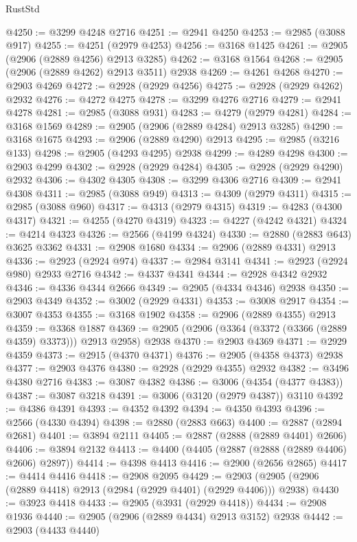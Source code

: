 \begin{lexlean}{RustStd}
\begin{coremodule}
{\begin{coremodule}
{{{{{{{{{{{{{{{{{{{{{{{{{{{{{{{{{{{{{{{{{{{{{{{{{{{{{{{{{{{{{{{{{{{{{{{{{{{{{{@4250 := @3299 @4248 @2716
@4251 := @2941 @4250
@4253 := @2985 (@3088 @917)
@4255 := @4251 (@2979 @4253)
@4256 := @3168 @1425
@4261 := @2905 (@2906 (@2889 @4256) @2913 @3285)
@4262 := @3168 @1564
@4268 := @2905 (@2906 (@2889 @4262) @2913 @3511) @2938
@4269 := @4261 @4268
@4270 := @2903 @4269
@4272 := @2928 (@2929 @4256)
@4275 := @2928 (@2929 @4262) @2932
@4276 := @4272 @4275
@4278 := @3299 @4276 @2716
@4279 := @2941 @4278
@4281 := @2985 (@3088 @931)
@4283 := @4279 (@2979 @4281)
@4284 := @3168 @1569
@4289 := @2905 (@2906 (@2889 @4284) @2913 @3285)
@4290 := @3168 @1675
@4293 := @2906 (@2889 @4290) @2913
@4295 := @2985 (@3216 @133)
@4298 := @2905 (@4293 @4295) @2938
@4299 := @4289 @4298
@4300 := @2903 @4299
@4302 := @2928 (@2929 @4284)
@4305 := @2928 (@2929 @4290) @2932
@4306 := @4302 @4305
@4308 := @3299 @4306 @2716
@4309 := @2941 @4308
@4311 := @2985 (@3088 @949)
@4313 := @4309 (@2979 @4311)
@4315 := @2985 (@3088 @960)
@4317 := @4313 (@2979 @4315)
@4319 := @4283 (@4300 @4317)
@4321 := @4255 (@4270 @4319)
@4323 := @4227 (@4242 @4321)
@4324 := @4214 @4323
@4326 := @2566 (@4199 @4324)
@4330 := @2880 (@2883 @643) @3625 @3362
@4331 := @2908 @1680
@4334 := @2906 (@2889 @4331) @2913
@4336 := @2923 (@2924 @974)
@4337 := @2984 @3141
@4341 := @2923 (@2924 @980) @2933 @2716
@4342 := @4337 @4341
@4344 := @2928 @4342 @2932
@4346 := @4336 @4344 @2666
@4349 := @2905 (@4334 @4346) @2938
@4350 := @2903 @4349
@4352 := @3002 (@2929 @4331)
@4353 := @3008 @2917
@4354 := @3007 @4353
@4355 := @3168 @1902
@4358 := @2906 (@2889 @4355) @2913
@4359 := @3368 @1887
@4369 := @2905 (@2906 (@3364 (@3372 (@3366 (@2889 @4359) @3373))) @2913 @2958) @2938
@4370 := @2903 @4369
@4371 := @2929 @4359
@4373 := @2915 (@4370 @4371)
@4376 := @2905 (@4358 @4373) @2938
@4377 := @2903 @4376
@4380 := @2928 (@2929 @4355) @2932
@4382 := @3496 @4380 @2716
@4383 := @3087 @4382
@4386 := @3006 (@4354 (@4377 @4383))
@4387 := @3087 @3218
@4391 := @3006 (@3120 (@2979 @4387)) @3110
@4392 := @4386 @4391
@4393 := @4352 @4392
@4394 := @4350 @4393
@4396 := @2566 (@4330 @4394)
@4398 := @2880 (@2883 @663)
@4400 := @2887 (@2894 @2681)
@4401 := @3894 @2111
@4405 := @2887 (@2888 (@2889 @4401) @2606)
@4406 := @3894 @2132
@4413 := @4400 (@4405 (@2887 (@2888 (@2889 @4406) @2606) @2897))
@4414 := @4398 @4413
@4416 := @2900 (@2656 @2865)
@4417 := @4414 @4416
@4418 := @2908 @2095
@4429 := @2903 (@2905 (@2906 (@2889 @4418) @2913 (@2984 (@2929 @4401) (@2929 @4406))) @2938)
@4430 := @3923 @4418
@4433 := @2905 (@3931 (@2929 @4418))
@4434 := @2908 @1936
@4440 := @2905 (@2906 (@2889 @4434) @2913 @3152) @2938
@4442 := @2903 (@4433 @4440)
}}}}}}}}}}}}}}}}}}}}}}}}}}}}}}}}}}}}}}}}}}}}}}}}}}}}}}}}}}}}}}}}}}}}}}}}}}}}}}
\end{coremodule}}
\end{coremodule}
\end{lexlean}

